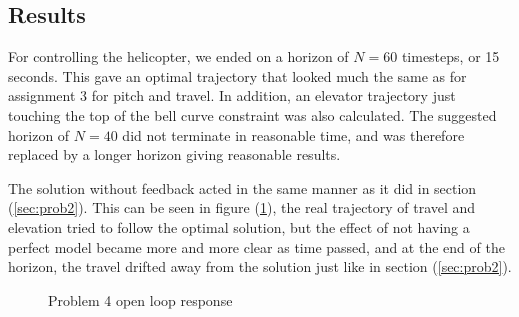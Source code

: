 
\subsection{Results}

For controlling the helicopter, we ended on a horizon of $N=60$ timesteps, or 15 seconds. This gave an optimal trajectory that looked much the same as for assignment 3 for pitch and travel. In addition, an elevator trajectory just touching the top of the bell curve constraint was also calculated. The suggested horizon of $N=40$ did not terminate in reasonable time, and was therefore replaced by a longer horizon giving reasonable results.%

The solution without feedback acted in the same manner as it did in section (\ref{sec:prob2}). This can be seen in figure (\ref{fig:day4_ol}), the real trajectory of travel and elevation tried to follow the optimal solution, but the effect of not having a perfect model became more and more clear as time passed, and at the end of the horizon, the travel drifted away from the solution just like in section (\ref{sec:prob2}).

\begin{figure}[htb]
    \centering
    \caption{Problem 4 open loop response}
    \label{fig:day4_ol}
\end{figure}

